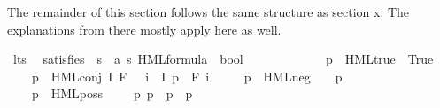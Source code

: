 \begin{isabellebody}
\begin{isamarkuptext}
The remainder of this section follows the same structure as section x. The explanations from there mostly apply here as well.%
\end{isamarkuptext}\isamarkuptrue%
\isamarkupfalse%
\ lts\ \isanewline
\isanewline
{}\isamarkupfalse%
\ satisfies\ {\isacharcolon}{\kern0pt}{\isacharcolon}{\kern0pt}\ {\isacartoucheopen}{\isacharprime}{\kern0pt}s\ {\isasymRightarrow}\ {\isacharparenleft}{\kern0pt}{\isacharprime}{\kern0pt}a{\isacharcomma}{\kern0pt}\ {\isacharprime}{\kern0pt}s{\isacharparenright}{\kern0pt}\ HML{\isacharunderscore}{\kern0pt}formula\ {\isasymRightarrow}\ bool{\isacartoucheclose}\ {\isacharparenleft}{\kern0pt}{\isacartoucheopen}{\isacharunderscore}{\kern0pt}\ {\isasymTurnstile}\ {\isacharunderscore}{\kern0pt}{\isacartoucheclose}\ {\isacharbrackleft}{\kern0pt}{}{}{\isacharcomma}{\kern0pt}\ {}{}{\isacharbrackright}{\kern0pt}\ {}{}{\isacharparenright}{\kern0pt}\isanewline
\ \ \isanewline
\ \ \ \ {\isacartoucheopen}{\isacharparenleft}{\kern0pt}p\ {\isasymTurnstile}\ HML{\isacharunderscore}{\kern0pt}true{\isacharparenright}{\kern0pt}\ {\isacharequal}{\kern0pt}\ True{\isacartoucheclose}\ {\isacharbar}{\kern0pt}\isanewline
\ \ \ \ {\isacartoucheopen}{\isacharparenleft}{\kern0pt}p\ {\isasymTurnstile}\ HML{\isacharunderscore}{\kern0pt}conj\ I\ F{\isacharparenright}{\kern0pt}\ {\isacharequal}{\kern0pt}\ {\isacharparenleft}{\kern0pt}{\isasymforall}\ i\ {\isasymin}\ I{\isachardot}{\kern0pt}\ p\ {\isasymTurnstile}\ {\isacharparenleft}{\kern0pt}F\ i{\isacharparenright}{\kern0pt}{\isacharparenright}{\kern0pt}{\isacartoucheclose}\ {\isacharbar}{\kern0pt}\isanewline
\ \ \ \ {\isacartoucheopen}{\isacharparenleft}{\kern0pt}p\ {\isasymTurnstile}\ HML{\isacharunderscore}{\kern0pt}neg\ {\isasymphi}{\isacharparenright}{\kern0pt}\ {\isacharequal}{\kern0pt}\ {\isacharparenleft}{\kern0pt}{\isasymnot}\ p\ {\isasymTurnstile}\ {\isasymphi}{\isacharparenright}{\kern0pt}{\isacartoucheclose}\ {\isacharbar}{\kern0pt}\isanewline
\ \ \ \ {\isacartoucheopen}{\isacharparenleft}{\kern0pt}p\ {\isasymTurnstile}\ HML{\isacharunderscore}{\kern0pt}poss\ {\isasymalpha}\ {\isasymphi}{\isacharparenright}{\kern0pt}\ {\isacharequal}{\kern0pt}\ {\isacharparenleft}{\kern0pt}{\isasymexists}\ p{\isacharprime}{\kern0pt}{\isachardot}{\kern0pt}\ p\ {\isasymlongmapsto}{\isasymalpha}\ p{\isacharprime}{\kern0pt}\ {\isasymand}\ p{\isacharprime}{\kern0pt}\ {\isasymTurnstile}\ {\isasymphi}{\isacharparenright}{\kern0pt}{\isacartoucheclose}\isanewline

\end{isabellebody}

